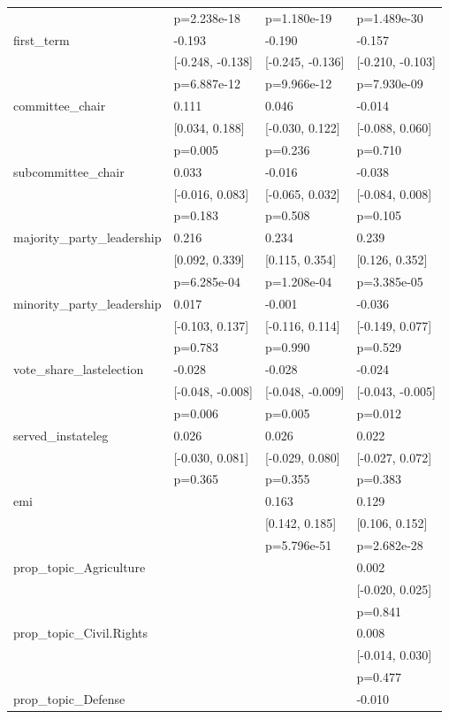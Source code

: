 \begin{tabular}{llll}
& p=2.238e-18 & p=1.180e-19 & p=1.489e-30 \\
first_term & -0.193 & -0.190 & -0.157 \\
& [-0.248, -0.138] & [-0.245, -0.136] & [-0.210, -0.103] \\
& p=6.887e-12 & p=9.966e-12 & p=7.930e-09 \\
committee_chair & 0.111 & 0.046 & -0.014 \\
& [0.034, 0.188] & [-0.030, 0.122] & [-0.088, 0.060] \\
& p=0.005 & p=0.236 & p=0.710 \\
subcommittee_chair & 0.033 & -0.016 & -0.038 \\
& [-0.016, 0.083] & [-0.065, 0.032] & [-0.084, 0.008] \\
& p=0.183 & p=0.508 & p=0.105 \\
majority_party_leadership & 0.216 & 0.234 & 0.239 \\
& [0.092, 0.339] & [0.115, 0.354] & [0.126, 0.352] \\
& p=6.285e-04 & p=1.208e-04 & p=3.385e-05 \\
minority_party_leadership & 0.017 & -0.001 & -0.036 \\
& [-0.103, 0.137] & [-0.116, 0.114] & [-0.149, 0.077] \\
& p=0.783 & p=0.990 & p=0.529 \\
vote_share_lastelection & -0.028 & -0.028 & -0.024 \\
& [-0.048, -0.008] & [-0.048, -0.009] & [-0.043, -0.005] \\
& p=0.006 & p=0.005 & p=0.012 \\
served_instateleg & 0.026 & 0.026 & 0.022 \\
& [-0.030, 0.081] & [-0.029, 0.080] & [-0.027, 0.072] \\
& p=0.365 & p=0.355 & p=0.383 \\
emi &  & 0.163 & 0.129 \\
&  & [0.142, 0.185] & [0.106, 0.152] \\
&  & p=5.796e-51 & p=2.682e-28 \\
prop_topic_Agriculture &  &  & 0.002 \\
&  &  & [-0.020, 0.025] \\
&  &  & p=0.841 \\
prop_topic_Civil.Rights &  &  & 0.008 \\
&  &  & [-0.014, 0.030] \\
&  &  & p=0.477 \\
prop_topic_Defense &  &  & -0.010 \\

\end{tabular}
